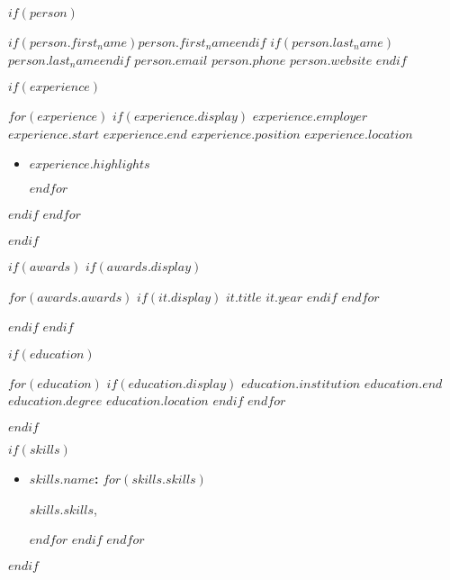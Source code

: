 $if(person)$
\def \fullName{%
  $if(person.first_name)$$person.first_name$$endif$
  $if(person.last_name)$$person.last_name$$endif$
}

\header
    {\fullName}
    {$person.email$}
    {$person.phone$}
    {$person.website$}
$endif$

$if(experience)$

\begin{itemize}[label={}, leftmargin=*]
    $for(experience)$
    $if(experience.display)$
    \experience
        {$experience.employer$}
        {$experience.start$}
        {$experience.end$}
        {$experience.position$}
        {$experience.location$}

    \begin{itemize}
      $for(experience.highlights)$
        \item
            \begin{small}
                $experience.highlights$
            \end{small}
        $endfor$
    \end{itemize}
    $endif$
    $endfor$
\end{itemize}
$endif$

$if(awards)$
$if(awards.display)$

\begin{itemize}[label={}, leftmargin=*, nosep]
    $for(awards.awards)$
        $if(it.display)$
            \award
                {$it.title$}
                {$it.year$}
        $endif$
    $endfor$
\end{itemize}
$endif$
$endif$

$if(education)$

\begin{itemize}[label={}, leftmargin=*]
    $for(education)$
    $if(education.display)$
    \education
        {$education.institution$}
        {$education.end$}
        {$education.degree$}
        {$education.location$}
    $endif$
    $endfor$
\end{itemize}
$endif$

$if(skills)$

\begin{itemize}[label={}, leftmargin=*, nosep]
    $for(skills)$
    $if(skills.display)$
        \item \textbf{$skills.name$:}
          $for(skills.skills)$
            \begin{small}%
                $skills.skills$,%
            \end{small}
          $endfor$
        $endif$
    $endfor$
\end{itemize}
$endif$
